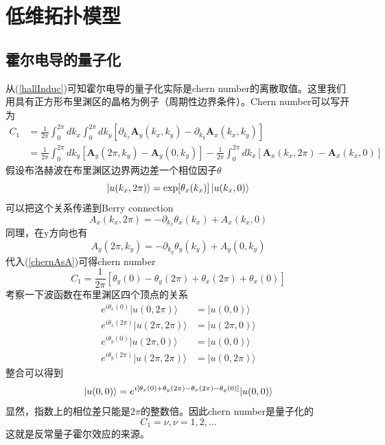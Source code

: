 \chapter{低维拓扑模型}
\section{霍尔电导的量子化}
从(\ref{hallInduc})可知霍尔电导的量子化实际是chern number的离散取值。这里我们用具有正方形布里渊区的晶格为例子（周期性边界条件）。Chern number可以写开为
\begin{equation}
\begin{aligned}
C_ 1 &= \frac{1}{2 \pi} \int_{0}^{2 \pi} d k_{x} \int_{0}^{2 \pi} d k_{y}\left[\partial_{k_{x}} \mathbf{A}_{y}\left(k_{x}, k_{y}\right)-\partial_{k_{y}} \mathbf{A}_{x}\left(k_{x}, k_{y}\right)\right]\\
&= \frac{1}{2 \pi} \int_{0}^{2 \pi} dk_{y}\left[\mathbf{A}_{y}\left(2 \pi, k_{y}\right)-\mathbf{A}_{y}\left(0, k_{y}\right)\right] -\frac{1}{2 \pi} \int_{0}^{2 \pi} d k_{x}\left[\mathbf{A}_{x}\left(k_{x}, 2 \pi\right)-\mathbf{A}_{x}\left(k_{x}, 0\right)\right] 
\label{chernAsA}
\end{aligned}
\end{equation}
假设布洛赫波在布里渊区边界两边差一个相位因子$\theta$
\begin{equation}
  \ket{u(k_x, 2 \pi)} = \mbox{exp}[\theta_x(k_x)] \ket{u(k_x, 0)}
\end{equation}
可以把这个关系传递到Berry connection
\begin{equation}
  A_x(k_x, 2 \pi) = - \partial_{k_x} \theta_x(k_x) + A_x(k_x, 0)
\end{equation}
同理，在y方向也有
\begin{equation}
A_{y}\left(2 \pi, k_{y}\right)=-\partial_{k_{y}} \theta_{y}\left(k_{y}\right)+A_{y}\left(0, k_{y}\right)
\end{equation}
代入(\ref{chernAsA})可得chern number
\begin{equation}
  C_1 = \frac{1}{2 \pi} [\theta_y(0) - \theta_y(2 \pi) + \theta_x(2 \pi) + \theta_x(0) ]
\end{equation}
考察一下波函数在布里渊区四个顶点的关系
\begin{equation}
\begin{aligned} e^{i \theta_{x}(0)}|u(0,2 \pi)\rangle &=|u(0,0)\rangle \\ e^{i \theta_{x}(2 \pi)}|u(2 \pi, 2 \pi)\rangle &=|u(2 \pi, 0)\rangle \\ e^{i \theta_{y}(0)}|u(2 \pi, 0)\rangle &=|u(0,0)\rangle \\ e^{i \theta_{y}(2 \pi)}|u(2 \pi, 2 \pi)\rangle &=|u(0,2 \pi)\rangle\end{aligned}
\end{equation}
整合可以得到
\begin{equation}
\ket{u(0,0)}=e^{i\left[\theta_{x}(0)+\theta_{y}(2 \pi)-\theta_{x}(2 \pi)-\theta_{y}(0)\right]}|u(0,0)\rangle
\end{equation}
显然，指数上的相位差只能是$2 \pi$的整数倍。因此chern number是量子化的
\begin{equation}
  C_1 = \nu, \nu = 1, 2, ...
\end{equation}
这就是反常量子霍尔效应的来源。
